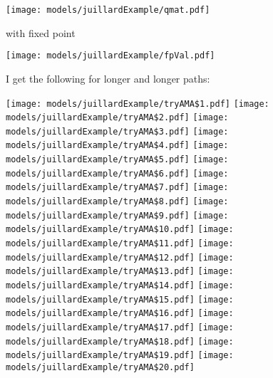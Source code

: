 \documentclass[12pt]{article}
\begin{document}
\texttt{[image: models/juillardExample/qmat.pdf]}

with fixed point

\texttt{[image: models/juillardExample/fpVal.pdf]}

I get the following for longer and longer paths:

\texttt{[image: models/juillardExample/tryAMA\$1.pdf]}
\texttt{[image: models/juillardExample/tryAMA\$2.pdf]}
\texttt{[image: models/juillardExample/tryAMA\$3.pdf]}
\texttt{[image: models/juillardExample/tryAMA\$4.pdf]}
\texttt{[image: models/juillardExample/tryAMA\$5.pdf]}
\texttt{[image: models/juillardExample/tryAMA\$6.pdf]}
\texttt{[image: models/juillardExample/tryAMA\$7.pdf]}
\texttt{[image: models/juillardExample/tryAMA\$8.pdf]}
\texttt{[image: models/juillardExample/tryAMA\$9.pdf]}
\texttt{[image: models/juillardExample/tryAMA\$10.pdf]}
\texttt{[image: models/juillardExample/tryAMA\$11.pdf]}
\texttt{[image: models/juillardExample/tryAMA\$12.pdf]}
\texttt{[image: models/juillardExample/tryAMA\$13.pdf]}
\texttt{[image: models/juillardExample/tryAMA\$14.pdf]}
\texttt{[image: models/juillardExample/tryAMA\$15.pdf]}
\texttt{[image: models/juillardExample/tryAMA\$16.pdf]}
\texttt{[image: models/juillardExample/tryAMA\$17.pdf]}
\texttt{[image: models/juillardExample/tryAMA\$18.pdf]}
\texttt{[image: models/juillardExample/tryAMA\$19.pdf]}
\texttt{[image: models/juillardExample/tryAMA\$20.pdf]}
\end{document}
